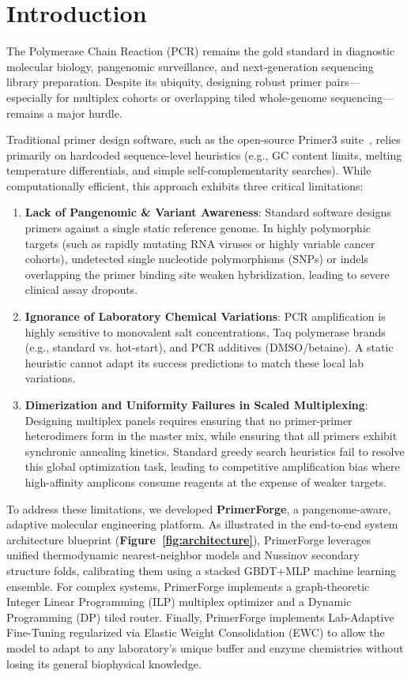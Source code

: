 \documentclass[twocolumn,10pt]{article}
\begin{document}
\section{Introduction}
The Polymerase Chain Reaction (PCR) remains the gold standard in diagnostic molecular biology, pangenomic surveillance, and next-generation sequencing library preparation. Despite its ubiquity, designing robust primer pairs---especially for multiplex cohorts or overlapping tiled whole-genome sequencing---remains a major hurdle. 

Traditional primer design software, such as the open-source Primer3 suite~\cite{untergasser2012}, relies primarily on hardcoded sequence-level heuristics (e.g., GC content limits, melting temperature differentials, and simple self-complementarity searches). While computationally efficient, this approach exhibits three critical limitations:
\begin{enumerate}
    \item \textbf{Lack of Pangenomic \& Variant Awareness}: Standard software designs primers against a single static reference genome. In highly polymorphic targets (such as rapidly mutating RNA viruses or highly variable cancer cohorts), undetected single nucleotide polymorphisms (SNPs) or indels overlapping the primer binding site weaken hybridization, leading to severe clinical assay dropouts.
    \item \textbf{Ignorance of Laboratory Chemical Variations}: PCR amplification is highly sensitive to monovalent salt concentrations, Taq polymerase brands (e.g., standard vs. hot-start), and PCR additives (DMSO/betaine). A static heuristic cannot adapt its success predictions to match these local lab variations.
    \item \textbf{Dimerization and Uniformity Failures in Scaled Multiplexing}: Designing multiplex panels requires ensuring that no primer-primer heterodimers form in the master mix, while ensuring that all primers exhibit synchronic annealing kinetics. Standard greedy search heuristics fail to resolve this global optimization task, leading to competitive amplification bias where high-affinity amplicons consume reagents at the expense of weaker targets.
\end{enumerate}

To address these limitations, we developed \textbf{PrimerForge}, a pangenome-aware, adaptive molecular engineering platform. As illustrated in the end-to-end system architecture blueprint (\textbf{Figure~\ref{fig:architecture}}), PrimerForge leverages unified thermodynamic nearest-neighbor models and Nussinov secondary structure folds, calibrating them using a stacked GBDT+MLP machine learning ensemble. For complex systems, PrimerForge implements a graph-theoretic Integer Linear Programming (ILP) multiplex optimizer and a Dynamic Programming (DP) tiled router. Finally, PrimerForge implements Lab-Adaptive Fine-Tuning regularized via Elastic Weight Consolidation (EWC) to allow the model to adapt to any laboratory's unique buffer and enzyme chemistries without losing its general biophysical knowledge.
\end{document}
